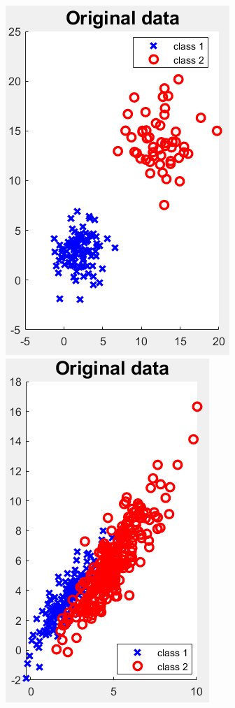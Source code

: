 \documentclass[a4paper, 11pt]{article}
\begin{document}
\begin{center}
	\includegraphics[scale=0.661]{separate_gaussian_dist.PNG}
	\includegraphics[scale=0.672]{overlapping_gaussian_dist.PNG}

\end{center}
\end{document}

